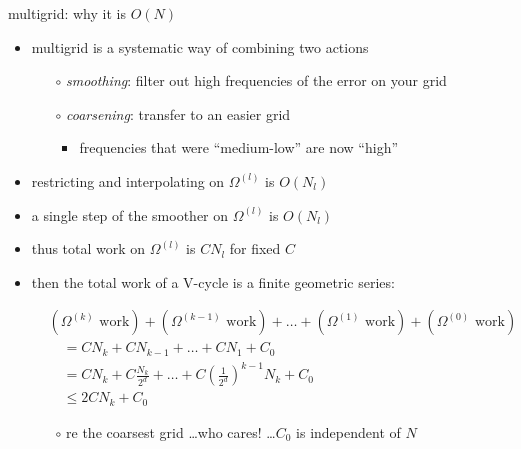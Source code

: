 \documentclass[hide notes,intlimits,usenames,dvipsnames]{beamer}
\begin{document}
\begin{frame}{multigrid: why it is $O(N)$}

\begin{itemize}
\item multigrid is a systematic way of combining two actions
	\begin{itemize}
	\item[$\circ$] \emph{smoothing}: filter out high frequencies of the error on your grid
	\item[$\circ$] \emph{coarsening}: transfer to an easier grid
    	\begin{itemize}
	    \item frequencies that were ``medium-low'' are now ``high''
    	\end{itemize}
	\end{itemize}
\item restricting and interpolating on $\Omega^{(l)}$ is $O(N_l)$
\item a single step of the smoother on $\Omega^{(l)}$ is $O(N_l)$
\item thus total work on $\Omega^{(l)}$ is $C N_l$ for fixed $C$
\item then the total work of a V-cycle is a finite geometric series:

\vspace{-3mm}
\small
\begin{align*}
&(\Omega^{(k)} \text{ work}) + (\Omega^{(k-1)} \text{ work}) + \dots + (\Omega^{(1)} \text{ work}) + (\Omega^{(0)} \text{ work}) \\
&\quad = C N_k + C N_{k-1} + \dots + C N_1 + C_0 \\
&\quad = C N_k + C \frac{N_k}{2^d}  + \dots + C \left(\frac{1}{2^d}\right)^{k-1} N_k + C_0 \\
&\quad \le 2 C N_k + C_0
\end{align*}

    \vspace{-2mm}
	\begin{itemize}
	\item[$\circ$] re the coarsest grid \dots who cares! \dots $C_0$ is independent of $N$
	\end{itemize}

\end{itemize}
\end{frame}

\newcommand{\niceprob}{V-cycle-preconditioned CG iterations on $\Omega=[0,1]^d$ Poisson}
\newcommand{\niceprobtwo}{V-cycle-preconditioned CG iterations on $\Omega=[0,1]^2$ Poisson}
\end{document}
